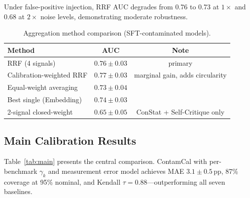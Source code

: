 \documentclass[letterpaper]{article}
\begin{document}
Under false-positive injection, RRF AUC degrades from 0.76 to 0.73 at $1\times$ and 0.68 at $2\times$ noise levels, demonstrating moderate robustness.

\begin{table}[t]
\centering
\caption{Aggregation method comparison (SFT-contaminated models).}
\label{tab:rrf}
\begin{tabular}{lcc}
\toprule
\textbf{Method} & \textbf{AUC} & \textbf{Note} \\
\midrule
RRF (4 signals) & $0.76{\pm}0.03$ & primary \\
Calibration-weighted RRF & $0.77{\pm}0.03$ & marginal gain, adds circularity \\
Equal-weight averaging & $0.73{\pm}0.04$ & \\
Best single (Embedding) & $0.74{\pm}0.03$ & \\
2-signal closed-weight & $0.65{\pm}0.05$ & ConStat + Self-Critique only \\
\bottomrule
\end{tabular}
\end{table}

\subsection{Main Calibration Results}
\label{sec:main_results}

Table~\ref{tab:main} presents the central comparison.
ContamCal with per-benchmark $\gamma_k$ and measurement error model achieves MAE $3.1{\pm}0.5$\,pp, 87\% coverage at 95\% nominal, and Kendall $\tau{=}0.88$---outperforming all seven baselines.
\end{document}
